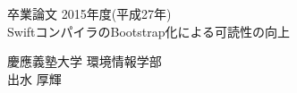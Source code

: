 \begin{titlepage}
  \begin{center}
    \begin{large}
      卒業論文   2015年度(平成27年)\\
      \vspace{24pt}
      SwiftコンパイラのBootstrap化による可読性の向上
      \end{large}
  \end{center}
  \vspace{40em}
  \begin{flushright}
    \large 慶應義塾大学 環境情報学部\\
    出水 厚輝
  \end{flushright}
\end{titlepage}
